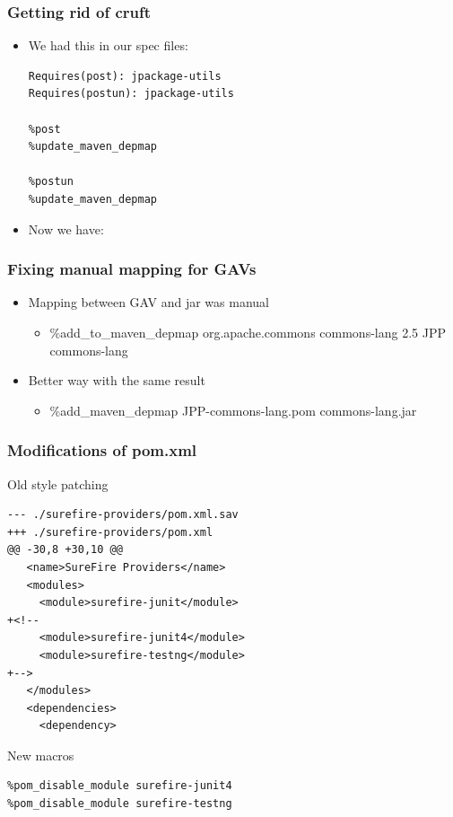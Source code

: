 \documentclass[pdftex,unicode,xcolor=table]{beamer}
\begin{document}
\begin{frame}[fragile]
  \frametitle{Getting rid of cruft}
  \begin{itemize}
  \item We had this in our spec files:
  \begin{verbatim}
Requires(post): jpackage-utils
Requires(postun): jpackage-utils

%post
%update_maven_depmap

%postun
%update_maven_depmap
\end{verbatim}
\item Now we have:
\end{itemize}
\end{frame}



\begin{frame}[fragile]
  \frametitle{Fixing manual mapping for GAVs}
  \begin{itemize}
    \item Mapping between GAV and jar was manual
      \begin{itemize}
      \item \%add\_to\_maven\_depmap org.apache.commons commons-lang 2.5 JPP commons-lang
      \end{itemize}
    \item Better way with the same result
      \begin{itemize}
      \item \%add\_maven\_depmap JPP-commons-lang.pom commons-lang.jar
      \end{itemize}
  \end{itemize}
\end{frame}


\begin{frame}[fragile]
  \scriptsize
\frametitle{Modifications of pom.xml}
  \begin{block}{Old style patching}
\begin{verbatim}
--- ./surefire-providers/pom.xml.sav
+++ ./surefire-providers/pom.xml
@@ -30,8 +30,10 @@
   <name>SureFire Providers</name>
   <modules>
     <module>surefire-junit</module>
+<!--
     <module>surefire-junit4</module>
     <module>surefire-testng</module>
+-->
   </modules>
   <dependencies>
     <dependency>
\end{verbatim}
\end{block}

  \begin{block}{New macros}
\begin{verbatim}
%pom_disable_module surefire-junit4
%pom_disable_module surefire-testng
\end{verbatim}
\end{block}

\end{frame}
\end{document}
